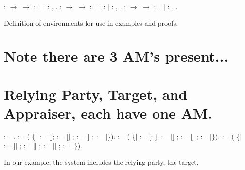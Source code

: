 \documentclass[12pt]{report}
\begin{document}
\begin{coqdoccode}
\coqdocemptyline
\coqdocnoindent
{}  :  \ensuremath{\rightarrow}  \ensuremath{\rightarrow}  := \coqdoceol
\coqdocnoindent
\ensuremath{|}  : \coqdockw{\ensuremath{\forall}} ,   .\coqdoceol
\coqdocemptyline
\coqdocnoindent
{}  :  \ensuremath{\rightarrow}  \ensuremath{\rightarrow}  := \coqdoceol
\coqdocnoindent
\ensuremath{|}  :    \coqdoceol
\coqdocnoindent
\ensuremath{|}  : \coqdockw{\ensuremath{\forall}} ,   .\coqdoceol
\coqdocemptyline
\coqdocnoindent
{}  :  \ensuremath{\rightarrow}  \ensuremath{\rightarrow}  := \coqdoceol
\coqdocnoindent
\ensuremath{|}  : \coqdockw{\ensuremath{\forall}} ,   .\coqdoceol
\coqdocemptyline
\end{coqdoccode}
Definition of environments for use in examples and proofs.  
\section{Note there are 3 AM's present...}


\section{Relying Party, Target, and Appraiser, each have one AM.}


 
\begin{coqdoccode}
\coqdocemptyline
\coqdocnoindent
{}  := .\coqdoceol
\coqdocnoindent
{}  :=\coqdoceol
\coqdocindent{2.00em}
   ( \{|  := []; := [] ;  := [] ;  :=  |\}).\coqdoceol
\coqdocnoindent
{}  :=\coqdoceol
\coqdocindent{2.00em}
   ( \{|  := [;  ]; := [] ;  := [] ;  := |\}).\coqdoceol
\coqdocnoindent
{}  :=\coqdoceol
\coqdocindent{2.00em}
   ( \{|  := [] ; := [] ;  := [] ;  :=  |\}).\coqdoceol
\coqdocemptyline
\end{coqdoccode}
In our example, the system includes the relying party, the target,
\end{document}
